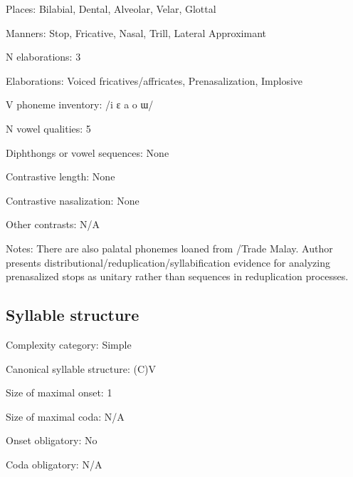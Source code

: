 {\begin{appendixdesc}
\item[Places:] Bilabial, Dental, Alveolar, Velar, Glottal

\item[Manners:] Stop, Fricative, Nasal, Trill, Lateral Approximant

\item[N elaborations:] 3

\item[Elaborations:] Voiced fricatives/affricates, Prenasalization, Implosive

\item[V phoneme inventory:] /i ɛ a o ɯ/

\item[N vowel qualities:] 5

\item[Diphthongs or vowel sequences:] None

\item[Contrastive length:] None

\item[Contrastive nasalization:] None

\item[Other contrasts:] N/A

\item[Notes:] There are also palatal phonemes loaned from /Trade Malay. Author presents distributional/reduplication/syllabification evidence for analyzing prenasalized stops as unitary rather than sequences in reduplication processes.
\end{appendixdesc}
\subsection*{Syllable structure}
\begin{appendixdesc}

\item[Complexity category:] Simple

\item[Canonical syllable structure:] (C)V \citep[30--31]{Donohue1999}

\item[Size of maximal onset:] 1

\item[Size of maximal coda:] N/A

\item[Onset obligatory:] No

\item[Coda obligatory:] N/A


\end{appendixdesc}}

